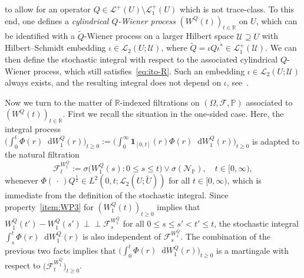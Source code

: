 \documentclass[reqno]{amsart}
\numberwithin{equation}{section}
\newcommand{\bbP}{\mathbb{P}}
\newcommand{\bbR}{\mathbb{R}}
\newcommand{\R}{\mathbb{R}}
\newcommand{\cF}{\mathcal{F}}
\newcommand{\cN}{\mathcal{N}}
\newcommand{\rd}{\mathop{}\!\mathrm{d}}
\newcommand{\dual}[1]{#1^*}
\newcommand{\ind}{\perp\!\!\!\perp}
\newcommand{\LO}{\mathscr L}
\theoremstyle{remark}
\theoremstyle{definition}
\begin{document}
to allow for an operator $Q \in \LO^+(U) \setminus \LO_1^+(U)$ 
which is not trace-class.
To this end, one defines a \emph{cylindrical $Q$-Wiener process}
$(W^Q(t))_{t\in\bbR}$
on $U$, which
can be identified with a $\widetilde Q$-Wiener process on 
a larger Hilbert space $\mathscr U \supseteq U$ 
with Hilbert--Schmidt embedding ${\iota \in \mathscr L_2(U; \mathscr U)}$,
where $\widetilde Q = \iota Q \dual\iota \in \mathscr L_1^+(\mathscr U)$.
We can then define the stochastic integral with respect to the associated
cylindrical $Q$-Wiener process, which still satisfies~\eqref{eq:ito-R}.
Such an embedding $\iota \in \mathscr L_2(U; \mathscr U)$ 
always exists, and the resulting integral does not depend
on $\iota$, see~\cite[Section~2.5]{LiuRockner2015}.

Now we turn to the matter of $\R$-indexed filtrations 
on $(\Omega, \cF, \bbP)$ associated
to $( W^Q(t) )_{t\in\R}$.
First we recall the situation in
the one-sided case. Here, the
integral process
$\bigl( \int_0^t \Phi(r) \rd W_1^Q(r) \bigr)_{t\geq 0} 
:= 
\bigl( \int_0^\infty \mathbf 1_{[0,t]}(r) \Phi(r) \rd W_1^Q(r) \bigr)_{t\geq 0}$
is adapted to the natural filtration
%
\[
\cF_t^{W_1^Q} 
:= 
\sigma\bigl( W_1^Q(s) : 0 \leq s \leq t \bigr) 
\vee \sigma(\cN_{\bbP}), 
\quad t \in [0,\infty),
\]
% 
whenever $\Phi(\,\cdot\,)Q^\frac{1}{2} \in L^2(0,t; \mathscr L_2(U; \widetilde U))$ 
for all $t \in [0,\infty)$,
which is immediate from the definition of the stochastic integral.
Since property~\ref{item:WP3} for $(W_1^Q(t))_{t\geq 0}$ 
implies that $W_1^Q(t') - W_1^Q(s') \ind \cF_s^{W_1^Q}$ 
for all $0 \leq s \leq s' < t' \le t$, 
the stochastic integral $\int_s^t \Phi(r)\rd W_1^Q(r)$ 
is also independent of $\cF_s^{W_1^Q}$\!.
The combination of the previous two facts implies that
$\bigl( \int_0^t \Phi(r)\rd W_1^Q(r) \bigr)_{t\geq 0}$ 
is a martingale with respect to $\bigl(\cF^{W_1^Q}_t\bigr)_{t\geq 0}$.
\end{document}
